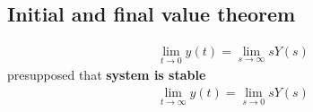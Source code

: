 \subsection{Initial and final value theorem}
        \begin{align*}
            \lim\limits_{t \rightarrow 0} y(t) = \lim\limits_{s \rightarrow \infty} s Y(s)
        \end{align*}
        presupposed that \textbf{system is stable}
        \begin{align*}
            \lim\limits_{t \rightarrow \infty} y(t) = \lim\limits_{s \rightarrow 0} s Y(s)
        \end{align*}